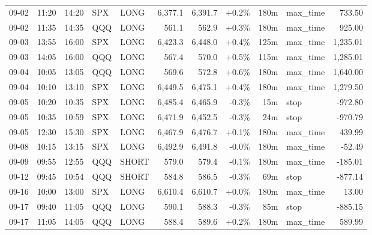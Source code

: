 \documentclass[11pt,a4paper,twoside]{article}
\begin{document}
\begin{center}
\begin{longtable}{>{\color{txtmain}}l l l l l r r r r >{\color{txtmain}}l r}
09-02 & 11:20 & 14:20 & SPX & LONG & 6,377.1 & 6,391.7 & \textcolor{wingreen}{+0.2\%} & 180m & max\_time & \textcolor{wingreen}{733.50} \\
09-02 & 11:35 & 14:35 & QQQ & LONG & 561.1 & 562.9 & \textcolor{wingreen}{+0.3\%} & 180m & max\_time & \textcolor{wingreen}{925.00} \\
09-03 & 13:55 & 16:00 & SPX & LONG & 6,423.3 & 6,448.0 & \textcolor{wingreen}{+0.4\%} & 125m & max\_time & \textcolor{wingreen}{1,235.01} \\
09-03 & 14:05 & 16:00 & QQQ & LONG & 567.4 & 570.0 & \textcolor{wingreen}{+0.5\%} & 115m & max\_time & \textcolor{wingreen}{1,285.01} \\
09-04 & 10:05 & 13:05 & QQQ & LONG & 569.6 & 572.8 & \textcolor{wingreen}{+0.6\%} & 180m & max\_time & \textcolor{wingreen}{1,640.00} \\
09-04 & 10:10 & 13:10 & SPX & LONG & 6,449.5 & 6,475.1 & \textcolor{wingreen}{+0.4\%} & 180m & max\_time & \textcolor{wingreen}{1,279.50} \\
09-05 & 10:20 & 10:35 & SPX & LONG & 6,485.4 & 6,465.9 & \textcolor{lossred}{-0.3\%} & 15m & stop & \textcolor{lossred}{-972.80} \\
09-05 & 10:35 & 10:59 & SPX & LONG & 6,471.9 & 6,452.5 & \textcolor{lossred}{-0.3\%} & 24m & stop & \textcolor{lossred}{-970.79} \\
09-05 & 12:30 & 15:30 & SPX & LONG & 6,467.9 & 6,476.7 & \textcolor{wingreen}{+0.1\%} & 180m & max\_time & \textcolor{wingreen}{439.99} \\
09-08 & 10:15 & 13:15 & SPX & LONG & 6,492.9 & 6,491.8 & \textcolor{lossred}{-0.0\%} & 180m & max\_time & \textcolor{lossred}{-52.49} \\
09-09 & 09:55 & 12:55 & QQQ & SHORT & 579.0 & 579.4 & \textcolor{lossred}{-0.1\%} & 180m & max\_time & \textcolor{lossred}{-185.01} \\
09-12 & 09:45 & 10:54 & QQQ & SHORT & 584.8 & 586.5 & \textcolor{lossred}{-0.3\%} & 69m & stop & \textcolor{lossred}{-877.14} \\
09-16 & 10:00 & 13:00 & SPX & LONG & 6,610.4 & 6,610.7 & \textcolor{wingreen}{+0.0\%} & 180m & max\_time & \textcolor{wingreen}{13.00} \\
09-17 & 09:40 & 11:05 & QQQ & LONG & 590.1 & 588.3 & \textcolor{lossred}{-0.3\%} & 85m & stop & \textcolor{lossred}{-885.15} \\
09-17 & 11:05 & 14:05 & QQQ & LONG & 588.4 & 589.6 & \textcolor{wingreen}{+0.2\%} & 180m & max\_time & \textcolor{wingreen}{589.99} \\

\end{longtable}
\end{center}
\end{document}
